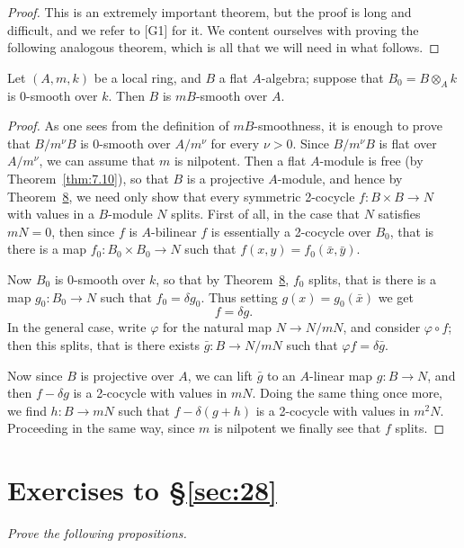 \begin{proof}
This is an extremely important theorem, but the proof is long and difficult, and
we refer to [G1] for it. We content ourselves with proving the following
analogous theorem, which is all that we will need in what follows.
\end{proof}

\begin{theorem}\label{thm:28.10}
Let $(A, m, k)$ be a local ring, and $B$ a flat $A$-algebra; suppose that
$B_0 = B \otimes_A k$ is 0-smooth over $k$. Then $B$ is $mB$-smooth over $A$.
\end{theorem}

\begin{proof}
As one sees from the definition of $mB$-smoothness, it is enough to prove that
$B/m^\nu B$ is 0-smooth over $A/m^\nu$ for every $\nu > 0$. Since $B/m^\nu B$ is flat over
$A/m^\nu$, we can assume that $m$ is nilpotent. Then a flat $A$-module is free (by
Theorem~\ref{thm:7.10}), so that $B$ is a projective $A$-module, and hence by
Theorem~\hyperref[thm:28.8]{8}, we need only show that every symmetric 2-cocycle
$f\colon B \times B \to N$ with values in a $B$-module $N$ splits. First of all, in the case
that $N$ satisfies $mN = 0$, then since $f$ is $A$-bilinear $f$ is essentially a
2-cocycle over $B_0$, that is there is a map $f_0\colon B_0 \times B_0 \to N$ such that
$f(x, y) = f_0(\bar{x}, \bar{y})$.

Now $B_0$ is 0-smooth over $k$, so that by Theorem~\hyperref[thm:28.8]{8}, $f_0$ splits, that is
there is a map $g_0\colon B_0 \to N$ such that $f_0 = \delta g_0$. Thus setting
$g(x) = g_0(\bar{x})$ we get
\[
  f = \delta g.
\]
In the general case, write $\varphi$ for the natural map $N \to N/mN$, and consider
$\varphi \circ f$; then this splits, that is there exists $\bar{g}\colon B \to N/mN$ such that
$\varphi f = \delta \bar{g}$.

Now since $B$ is projective over $A$, we can lift $\bar{g}$ to an $A$-linear map
$g\colon B \to N$, and then $f - \delta g$ is a 2-cocycle with values in $mN$. Doing the same
thing once more, we find $h\colon B \to mN$ such that $f - \delta(g + h)$ is a 2-cocycle with
values in $m^2N$. Proceeding in the same way, since $m$ is nilpotent we finally see
that $f$ splits.
\end{proof}

\section*{Exercises to \S\ref{sec:28}}
\emph{Prove the following propositions.}

